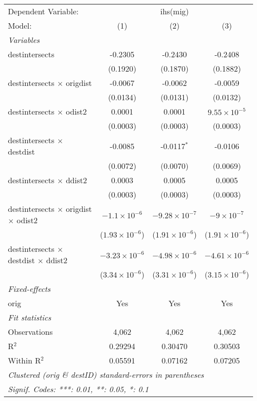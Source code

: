 \begin{tabular}{lccc}
\tabularnewline\midrule\midrule
Dependent Variable:&\multicolumn{3}{c}{ihs(mig)}\\
Model:&(1) & (2) & (3)\\
\midrule \emph{Variables}&   &   &  \\
destintersects & -0.2305 & -0.2430 & -0.2408\\
  &(0.1920) & (0.1870) & (0.1882)\\
destintersects $\times $ origdist & -0.0067 & -0.0062 & -0.0059\\
  &(0.0134) & (0.0131) & (0.0132)\\
destintersects $\times $ odist2 & 0.0001 & 0.0001 & $9.55\times 10^{-5}$\\
  &(0.0003) & (0.0003) & (0.0003)\\
destintersects $\times $ destdist & -0.0085 & -0.0117$^{*}$ & -0.0106\\
  &(0.0072) & (0.0070) & (0.0069)\\
destintersects $\times $ ddist2 & 0.0003 & 0.0005 & 0.0005\\
  &(0.0003) & (0.0003) & (0.0003)\\
destintersects $\times $ origdist $\times $ odist2 & $-1.1\times 10^{-6}$ & $-9.28\times 10^{-7}$ & $-9\times 10^{-7}$\\
  &($1.93\times 10^{-6}$) & ($1.91\times 10^{-6}$) & ($1.91\times 10^{-6}$)\\
destintersects $\times $ destdist $\times $ ddist2 & $-3.23\times 10^{-6}$ & $-4.98\times 10^{-6}$ & $-4.61\times 10^{-6}$\\
  &($3.34\times 10^{-6}$) & ($3.31\times 10^{-6}$) & ($3.15\times 10^{-6}$)\\
\midrule \emph{Fixed-effects}&   &   &  \\
orig & Yes & Yes & Yes\\
\midrule \emph{Fit statistics}&  & & \\
Observations & 4,062&4,062&4,062\\
R$^2$ & 0.29294&0.30470&0.30503\\
Within R$^2$ & 0.05591&0.07162&0.07205\\
\midrule\midrule\multicolumn{4}{l}{\emph{Clustered (orig \& destID) standard-errors in parentheses}}\\
\multicolumn{4}{l}{\emph{Signif. Codes: ***: 0.01, **: 0.05, *: 0.1}}\\
\end{tabular}


